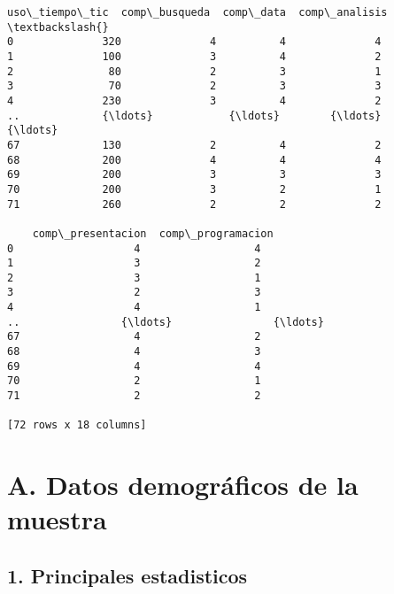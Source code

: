 \documentclass[11pt]{article}
\begin{document}
\begin{tcolorbox}[breakable, size=fbox, boxrule=.5pt, pad at break*=1mm, opacityfill=0]
\begin{Verbatim}[commandchars=\\\{\}]
    uso\_tiempo\_tic  comp\_busqueda  comp\_data  comp\_analisis  \textbackslash{}
0              320              4          4              4
1              100              3          4              2
2               80              2          3              1
3               70              2          3              3
4              230              3          4              2
..             {\ldots}            {\ldots}        {\ldots}            {\ldots}
67             130              2          4              2
68             200              4          4              4
69             200              3          3              3
70             200              3          2              1
71             260              2          2              2

    comp\_presentacion  comp\_programacion
0                   4                  4
1                   3                  2
2                   3                  1
3                   2                  3
4                   4                  1
..                {\ldots}                {\ldots}
67                  4                  2
68                  4                  3
69                  4                  4
70                  2                  1
71                  2                  2

[72 rows x 18 columns]
\end{Verbatim}
\end{tcolorbox}
        
    \section{A. Datos demográficos de la
muestra}\label{a.-datos-demogruxe1ficos-de-la-muestra}

    \subsection{1. Principales estadisticos}\label{principales-estadisticos}
\end{document}
